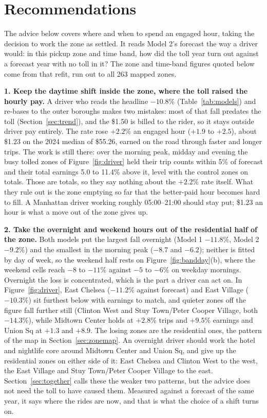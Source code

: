 \documentclass[11pt]{article}
\begin{document}
\section{Recommendations}
\label{sec:recommendations}
The advice below covers where and when to spend an engaged hour, taking the decision to work the zone as settled. It reads Model 2's forecast the way a driver would: in this pickup zone and time band, how did the toll year turn out against a forecast year with no toll in it? The zone and time-band figures quoted below come from that refit, run out to all 263 mapped zones.

\textbf{1. Keep the daytime shift inside the zone, where the toll raised the hourly pay.} A driver who reads the headline $-10.8\%$ (Table~\ref{tab:models}) and re-bases to the outer boroughs makes two mistakes: most of that fall predates the toll (Section~\ref{sec:trend}), and the \$1.50 is billed to the rider, so it stays outside driver pay entirely. The rate rose $+2.2\%$ an engaged hour ($+1.9$ to $+2.5$), about \$1.23 on the 2024 median of \$55.26, earned on the road through faster and longer trips. The work is still there: over the morning peak, midday and evening the busy tolled zones of Figure~\ref{fig:driver} held their trip counts within 5\% of forecast and their total earnings 5.0 to 11.4\% above it, level with the control zones on totals. Those are totals, so they say nothing about the $+2.2\%$ rate itself. What they rule out is the zone emptying so far that the better-paid hour becomes hard to fill. A Manhattan driver working roughly 05:00--21:00 should stay put; \$1.23 an hour is what a move out of the zone gives up.

\textbf{2. Take the overnight and weekend hours out of the residential half of the zone.} Both models put the largest fall overnight (Model 1 $-11.8\%$, Model 2 $-9.2\%$) and the smallest in the morning peak ($-8.7$ and $-6.2$); neither is fitted by day of week, so the weekend half rests on Figure~\ref{fig:bandday}(b), where the weekend cells reach $-8$ to $-11\%$ against $-5$ to $-6\%$ on weekday mornings. Overnight the loss is concentrated, which is the part a driver can act on. In Figure~\ref{fig:driver}, East Chelsea ($-11.2\%$ against forecast) and East Village ($-10.3\%$) sit furthest below with earnings to match, and quieter zones off the figure fall further still (Clinton West and Stuy Town/Peter Cooper Village, both $-14.3\%$), while Midtown Center holds at $+2.8\%$ trips and $+9.5\%$ earnings and Union Sq at $+1.3$ and $+8.9$. The losing zones are the residential ones, the pattern of the map in Section~\ref{sec:zonemap}. An overnight driver should work the hotel and nightlife core around Midtown Center and Union Sq, and give up the residential zones on either side of it: East Chelsea and Clinton West to the west, the East Village and Stuy Town/Peter Cooper Village to the east. Section~\ref{sec:together} calls these the weaker two patterns, but the advice does not need the toll to have caused them. Measured against a forecast of the same year, it says where the rides are now, and that is what the choice of a shift turns on.
\end{document}
